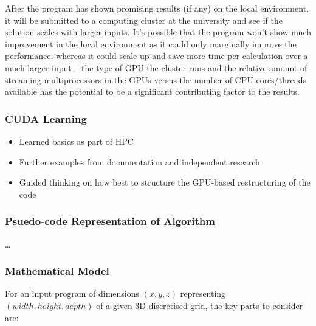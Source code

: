 \documentclass[conference]{IEEEtran}
\begin{document}
After the program has shown promising results (if any) on the local environment, it will be submitted to a computing cluster at the university and see if the solution scales with larger inputs. It’s possible that the program won’t show much improvement in the local environment as it could only marginally improve the performance, whereas it could scale up and save more time per calculation over a much larger input – the type of GPU the cluster runs and the relative amount of streaming multiprocessors in the GPUs versus the number of CPU cores/threads available has the potential to be a significant contributing factor to the results.


\subsubsection{CUDA Learning}

\begin{itemize}
\item Learned basics as part of HPC
\item Further examples from documentation and independent research
\item Guided thinking on how best to structure the GPU-based restructuring of the code
\end{itemize}

\subsubsection{Psuedo-code Representation of Algorithm}

\dots{}

\subsubsection{Mathematical Model}

For an input program of dimensions $ (x, y, z) $ representing $ (width, height, depth) $ of a given 3D discretised grid, the key parts to consider are:
\end{document}
